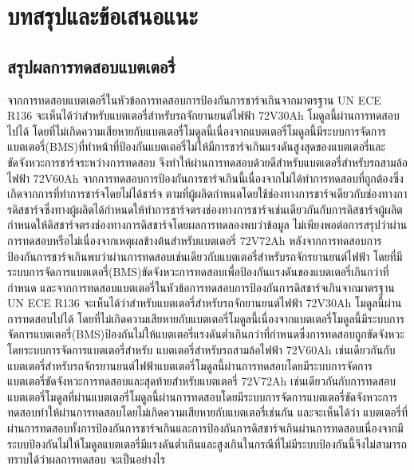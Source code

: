\nopagebreak
\chapter{บทสรุปและข้อเสนอแนะ}
\section{สรุปผลการทดสอบแบตเตอรี่}
จากการทดสอบแบตเตอรี่ในหัวข้อการทดสอบการป้องกันการชาร์จเกินจากมาตรฐาน UN ECE R136 จะเห็นได้ว่าสำหรับแบตเตอรี่สำหรับรถจักยานยนต์ไฟฟ้า 72V30Ah โมดูลนี้ผ่านการทดสอบไปได้
โดยที่ไม่เกิดความเสียหายกับแบตเตอรี่โมดูลนี้เนื่องจากแบตเตอรี่โมดูลนี้มีระบบการจัดการแบตเตอรี่(BMS)ที่ทำหน้าที่ป้องกันแบตเตอรี่ไม่ให้มีการชาร์จเกินแรงดันสูงสุดของแบตเตอรี่และขัดจังหวะการชาร์จระหว่างการทดสอบ
จึงทำให้ผ่านการทดสอบด้วยดีสำหรับแบตเตอรี่สำหรับรถสามล้อไฟฟ้า 72V60Ah จากการทดสอบการป้องกันการชาร์จเกินนี้เนื่องจากไม่ได้ทำการทดสอบที่ถูกต้องซึ่งเกิดจากการที่ทำการชาร์จโดยไม่ได้ชาร์จ
ตามที่ผู้ผลิตกำหนดโดยใช้ช่องทางการชาร์จเดียวกับช่องทางการดิสชาร์จซึ่งทางผู้ผลิตได้กำหนดให้ทำการชาร์จตรงช่องทางการชาร์จเช่นเดียวกันกับการดิสชาร์จผู้ผลิตกำหนดให้ดิสชาร์จตรงช่องทางการดิสชาร์จโดยผลการทดลองพบว่าข้อมูล
ไม่เพียงพอต่อการสรุปว่าผ่านการทดสอบหรือไม่เนื่องจากเหตุผลข้างต้นสำหรับแบตเตอรี่ 72V72Ah หลังจากการทดสอบการป้องกันการชาร์จเกินพบว่าผ่านการทดสอบเช่นเดียวกับแบตเตอรี่สำหรับรถจักรยานยนต์ไฟฟ้า
โดยที่มีระบบการจัดการแบตเตอรี่(BMS)ขัดจังหวะการทดสอบเพื่อป้องกันแรงดันของแบตเตอรี่เกินกว่าที่กำหนด
\newline
\hspace*{2cm}
และจากการทดสอบแบตเตอรี่ในหัวข้อการทดสอบการป้องกันการดิสชาร์จเกินจากมาตรฐาน UN ECE R136 จะเห็นได้ว่าสำหรับแบตเตอรี่สำหรับรถจักยานยนต์ไฟฟ้า 72V30Ah โมดูลนี้ผ่านการทดสอบไปได้
โดยที่ไม่เกิดความเสียหายกับแบตเตอรี่โมดูลนี้เนื่องจากแบตเตอรี่โมดูลนี้มีระบบการจัดการแบตเตอรี่(BMS)ป้องกันไม่ให้แบตเตอรี่แรงดันต่ำเกินกว่าที่กำหนดซึ่งการทดสอบถูกขัดจังหวะโดยระบบการจัดการแบตเตอรี่สำหรับ
แบตเตอรี่สำหรับรถสามล้อไฟฟ้า 72V60Ah เช่นเดียวกันกับแบตเตอรี่สำหรับรถจักรยานยนต์ไฟฟ้าแบตเตอรี่โมดูลนี้ผ่านการทดสอบโดยมีระบบการจัดการแบตเตอรี่ขัดจังหวะการทดสอบและสุดท้ายสำหรับแบตเตอรี่ 72V72Ah
เช่นเดียวกันกับการทดสอบแบตเตอรี่โมดูลที่ผ่านแบตเตอรี่โมดูลนี้ผ่านการทดสอบโดยมีระบบการจัดการแบตเตอรี่ขัดจังหวะการทดสอบทำให้ผ่านการทดสอบโดยไม่เกิดความเสียหายกับแบตเตอรี่เช่นกัน และจะเห็นได้ว่า
แบตเตอรี่ที่ผ่านการทดสอบทั้งการป้องกันการชาร์จเกินและการป้องกันการดิสชาร์จเกินผ่านการทดสอบเนื่องจากมีระบบป้องกันไม่ให้โมดูลแบตเตอรี่มีแรงดันต่ำเกินและสูงเกินในกรณีที่ไม่มีระบบป้องกันนี้จึงไม่สามารถทราบได้ว่าผลการทดสอบ
จะเป็นอย่างไร
\newline
\hspace*{2cm}
